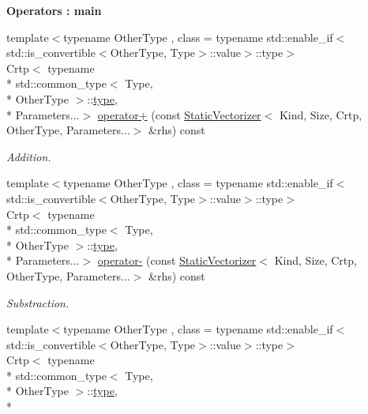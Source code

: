 \begin{Indent}{\bf Operators \-: main}\par
\begin{DoxyCompactItemize}
\item 
{\footnotesize template$<$typename Other\-Type , class  = typename std\-::enable\-\_\-if$<$std\-::is\-\_\-convertible$<$\-Other\-Type, Type$>$\-::value$>$\-::type$>$ }\\Crtp$<$ typename \\*
std\-::common\-\_\-type$<$ Type, \\*
Other\-Type $>$\-::\hyperlink{classmagrathea_1_1StaticVectorizer_a28c393a3896a3e839008c35d56b10a54}{type}, \\*
Parameters...$>$ \hyperlink{classmagrathea_1_1StaticVectorizer_a567b025704b733cbd38dc5504102dfca}{operator+} (const \hyperlink{classmagrathea_1_1StaticVectorizer}{Static\-Vectorizer}$<$ Kind, Size, Crtp, Other\-Type, Parameters...$>$ \&rhs) const 
\begin{DoxyCompactList}\small\item\em Addition. \end{DoxyCompactList}\item 
{\footnotesize template$<$typename Other\-Type , class  = typename std\-::enable\-\_\-if$<$std\-::is\-\_\-convertible$<$\-Other\-Type, Type$>$\-::value$>$\-::type$>$ }\\Crtp$<$ typename \\*
std\-::common\-\_\-type$<$ Type, \\*
Other\-Type $>$\-::\hyperlink{classmagrathea_1_1StaticVectorizer_a28c393a3896a3e839008c35d56b10a54}{type}, \\*
Parameters...$>$ \hyperlink{classmagrathea_1_1StaticVectorizer_a9323dd009e06bac4ff6c426217a11443}{operator-\/} (const \hyperlink{classmagrathea_1_1StaticVectorizer}{Static\-Vectorizer}$<$ Kind, Size, Crtp, Other\-Type, Parameters...$>$ \&rhs) const 
\begin{DoxyCompactList}\small\item\em Substraction. \end{DoxyCompactList}\item 
{\footnotesize template$<$typename Other\-Type , class  = typename std\-::enable\-\_\-if$<$std\-::is\-\_\-convertible$<$\-Other\-Type, Type$>$\-::value$>$\-::type$>$ }\\Crtp$<$ typename \\*
std\-::common\-\_\-type$<$ Type, \\*
Other\-Type $>$\-::\hyperlink{classmagrathea_1_1StaticVectorizer_a28c393a3896a3e839008c35d56b10a54}{type}, \\*

\end{DoxyCompactItemize}
\end{Indent}
